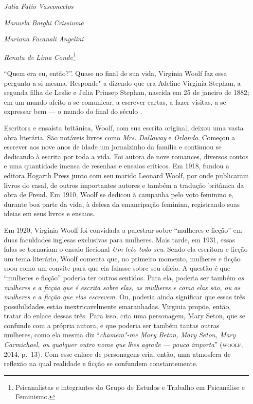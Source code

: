 \begin{flushright}
\emph{Julia Fatio Vasconcelos}

\emph{Manuela Borghi Crissiuma}

\emph{Mariana Facanali Angelini}

\emph{Renata de Lima Conde}\footnote{Psicanalistas e integrantes do Grupo de Estudos e
  Trabalho em Psicanálise e Feminismo.}
\end{flushright}

``Quem era eu, então?''. Quase no final de sua vida, Virginia Woolf faz
essa pergunta a si mesma. Responde"-a dizendo que era Adeline Virginia
Stephan, a segunda filha de Leslie e Julia Prinsep Stephan, nascida em
25 de janeiro de 1882; em um mundo afeito a se comunicar, a escrever
cartas, a fazer visitas, a se expressar bem --- o mundo do final do século
.

Escritora e ensaísta britânica, Woolf, com sua escrita original, deixou
uma vasta obra literária. São notáveis livros como \emph{Mrs.
Dalloway} e \emph{Orlando}. Começou a escrever aos nove anos de idade um
jornalzinho da família e continuou se dedicando à escrita por toda a
vida. Foi autora de nove romances, diversos contos e uma quantidade
imensa de resenhas e ensaios críticos. Em 1918, fundou a editora Hogarth
Press junto com seu marido Leonard Woolf, por onde publicaram livros do
casal, de outros importantes autores e também a tradução britânica da
obra de Freud. Em 1910, Woolf se dedicou à campanha pelo voto feminino
e, durante boa parte da vida, à defesa da emancipação feminina,
registrando suas ideias em seus livros e ensaios.

Em 1920, Virginia Woolf foi convidada a palestrar sobre ``mulheres e
ficção'' em duas faculdades inglesas exclusivas para mulheres. Mais
tarde, em 1931, essas falas se tornariam o ensaio ficcional \emph{Um
teto todo seu}. Sendo ela escritora e ficção um tema literário, Woolf comenta que, no primeiro momento, mulheres e ficção soou como um convite para que ela falasse sobre seu ofício. A questão é que ``mulheres e ficção'' poderia
ter outros sentidos. Para ela, poderia ser também \emph{as
mulheres e a ficção que é escrita sobre elas, as mulheres e como elas
são, ou as mulheres e a ficção que elas escrevem}. Ou, poderia ainda
significar que essas três possibilidades estão inextricavelmente
emaranhadas. Virginia propõe, então, tratar do enlace dessas três. Para
isso, cria uma personagem, Mary Seton, que se confunde com a própria
autora, e que poderia ser também tantas outras mulheres, como ela mesma
diz ``\emph{chamem"-me Mary Beton, Mary Seton, Mary Carmichael, ou
qualquer outro nome que lhes agrade --- pouco importa}'' (\textsc{woolf}, 2014,
p.~13). Com esse enlace de personagens cria, então, uma atmosfera de
reflexão na qual realidade e ficção se confundem constantemente.

